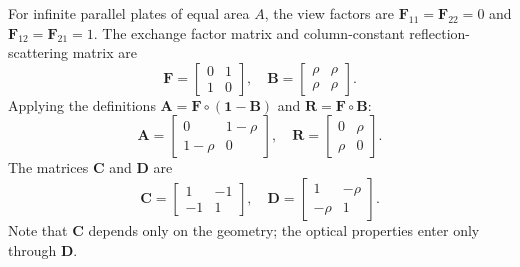 \documentclass[preprint,1p,times]{elsarticle}
\theoremstyle{plain}
\theoremstyle{definition}
\theoremstyle{remark}
\begin{document}
For infinite parallel plates of equal area $A$, the view factors are $\mathbf{F}_{11} = \mathbf{F}_{22} = 0$ and $\mathbf{F}_{12} = \mathbf{F}_{21} = 1$. The exchange factor matrix and column-constant reflection-scattering matrix are
\begin{equation}
\mathbf{F} = \begin{bmatrix} 0 & 1 \\ 1 & 0 \end{bmatrix},
\quad
\mathbf{B} = \begin{bmatrix} \rho & \rho \\ \rho & \rho \end{bmatrix}.
\end{equation}
Applying the definitions $\mathbf{A} = \mathbf{F}\circ(\mathbf{1}-\mathbf{B})$ and $\mathbf{R} = \mathbf{F}\circ\mathbf{B}$:
\begin{equation}
\mathbf{A} = \begin{bmatrix} 0 & 1-\rho \\ 1-\rho & 0 \end{bmatrix},
\quad
\mathbf{R} = \begin{bmatrix} 0 & \rho \\ \rho & 0 \end{bmatrix}.
\end{equation}
The matrices $\mathbf{C}$ and $\mathbf{D}$ are
\begin{equation}
\mathbf{C} = \begin{bmatrix} 1 & -1 \\ -1 & 1 \end{bmatrix},
\quad
\mathbf{D} = \begin{bmatrix} 1 & -\rho \\ -\rho & 1 \end{bmatrix}.
\end{equation}
Note that $\mathbf{C}$ depends only on the geometry; the optical properties enter only through $\mathbf{D}$.
\end{document}
